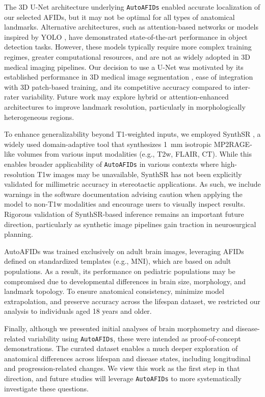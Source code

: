 The 3D U-Net architecture underlying \texttt{AutoAFIDs} enabled accurate localization of our selected AFIDs, but it may not be optimal for all types of anatomical landmarks. Alternative architectures, such as attention-based networks or models inspired by YOLO \cite{Redmon2015-ia}, have demonstrated state-of-the-art performance in object detection tasks. However, these models typically require more complex training regimes, greater computational resources, and are not as widely adopted in 3D medical imaging pipelines. Our decision to use a U-Net was motivated by its established performance in 3D medical image segmentation \cite{Cicek2016-dz}, ease of integration with 3D patch-based training, and its competitive accuracy compared to inter-rater variability. Future work may explore hybrid or attention-enhanced architectures to improve landmark resolution, particularly in morphologically heterogeneous regions.

To enhance generalizability beyond T1-weighted inputs, we employed SynthSR \cite{Iglesias2023-co}, a widely used domain-adaptive tool that synthesizes 1~mm isotropic MP2RAGE-like volumes from various input modalities (e.g., T2w, FLAIR, CT). While this enables broader applicability of \texttt{AutoAFIDs} in various contexts where high-resolution T1w images may be unavailable, SynthSR has not been explicitly validated for millimetric accuracy in stereotactic applications. As such, we include warnings in the software documentation advising caution when applying the model to non-T1w modalities and encourage users to visually inspect results. Rigorous validation of SynthSR-based inference remains an important future direction, particularly as synthetic image pipelines gain traction in neurosurgical planning.

AutoAFIDs was trained exclusively on adult brain images, leveraging AFIDs defined on standardized templates (e.g., MNI), which are based on adult populations. As a result, its performance on pediatric populations may be compromised due to developmental differences in brain size, morphology, and landmark topology. To ensure anatomical consistency, minimize model extrapolation, and preserve accuracy across the lifespan dataset, we restricted our analysis to individuals aged 18 years and older.

Finally, although we presented initial analyses of brain morphometry and disease-related variability using \texttt{AutoAFIDs}, these were intended as proof-of-concept demonstrations. The curated dataset enables a much deeper exploration of anatomical differences across lifespan and disease states, including longitudinal and progression-related changes. We view this work as the first step in that direction, and future studies will leverage \texttt{AutoAFIDs} to more systematically investigate these questions.

